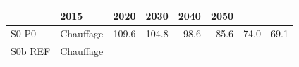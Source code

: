 \documentclass[]{article}
\begin{document}
\begin{longtable}[]{@{}llrrrrrr@{}}
\begin{minipage}[b]{0.09\columnwidth}
\end{minipage} & \begin{minipage}[b]{0.09\columnwidth}\raggedleft\strut
2015\strut
\end{minipage} & \begin{minipage}[b]{0.09\columnwidth}\raggedleft\strut
2020\strut
\end{minipage} & \begin{minipage}[b]{0.09\columnwidth}\raggedleft\strut
2030\strut
\end{minipage} & \begin{minipage}[b]{0.09\columnwidth}\raggedleft\strut
2040\strut
\end{minipage} & \begin{minipage}[b]{0.09\columnwidth}\raggedleft\strut
2050\strut
\end{minipage}\tabularnewline
\midrule
\endhead
\begin{minipage}[t]{0.14\columnwidth}\raggedright\strut
S0 P0\strut
\end{minipage} & \begin{minipage}[t]{0.13\columnwidth}\raggedright\strut
Chauffage\strut
\end{minipage} & \begin{minipage}[t]{0.09\columnwidth}\raggedleft\strut
109.6\strut
\end{minipage} & \begin{minipage}[t]{0.09\columnwidth}\raggedleft\strut
104.8\strut
\end{minipage} & \begin{minipage}[t]{0.09\columnwidth}\raggedleft\strut
98.6\strut
\end{minipage} & \begin{minipage}[t]{0.09\columnwidth}\raggedleft\strut
85.6\strut
\end{minipage} & \begin{minipage}[t]{0.09\columnwidth}\raggedleft\strut
74.0\strut
\end{minipage} & \begin{minipage}[t]{0.09\columnwidth}\raggedleft\strut
69.1\strut
\end{minipage}\tabularnewline
\begin{minipage}[t]{0.14\columnwidth}\raggedright\strut
S0b REF\strut
\end{minipage} & \begin{minipage}[t]{0.13\columnwidth}\raggedright\strut
Chauffage\strut
\end{minipage} & \begin{minipage}[t]{0.09\columnwidth}\raggedleft\strut

\end{minipage}
\end{longtable}
\end{document}
